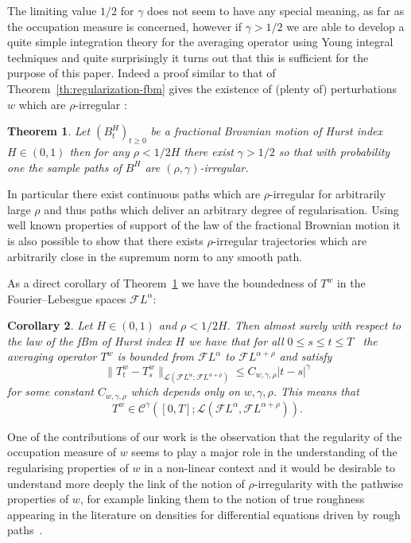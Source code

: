 \documentclass[a4paper,11pt]{article}
\newtheorem{theorem}{Theorem}[section]
\newtheorem{corollary}[theorem]{Corollary}
\newcommand{\CC}{\mathscr C}
\newcommand{\CF}{\mathscr F}
\begin{document}
The limiting value $1/2$ for $\gamma$ does not seem to have any special meaning, as
far as the occupation measure is concerned, however if $\gamma >1/2$ we are
able to develop a quite simple integration theory for the averaging operator
using Young integral techniques and quite surprisingly it turns out that this
is sufficient for the purpose of this paper. Indeed a proof similar to that of
Theorem~\ref{th:regularization-fbm} gives the existence of (plenty of)
perturbations $w$ which are $\rho$-irregular :

\begin{theorem}
  \label{th:irr-for-fbm}Let $(B^{H}_{t} )_{t \geqslant 0}$ be a fractional
  Brownian motion of Hurst index $H \in ( 0,1 )$ then for any $\rho <1/2H$
  there exist $\gamma >1/2$ so that with probability one the sample paths of
  $B^{H}$ are $( \rho , \gamma )$-irregular.
\end{theorem}

In particular there exist continuous paths which are $\rho$-irregular for
arbitrarily large $\rho$ and thus paths which deliver an arbitrary degree of
regularisation. Using well known properties of support of the law of the
fractional Brownian motion it is also possible to show that there exists $\rho$-irregular
trajectories which are arbitrarily close in the supremum norm to any smooth
path.



As a direct corollary of Theorem~\ref{th:irr-for-fbm} we have the boundedness
of $T^{w}$ in the Fourier--Lebesgue spaces $\CF L^{\alpha}$:

\begin{corollary}
  Let $H \in ( 0,1 )$ and $\rho <1/2H$. Then almost surely with respect to the law of the
  fBm of Hurst index $H$ we have that for all $0 \leqslant s \leqslant t
  \leqslant T$ \ the averaging operator $T^{w}$ is bounded from $\CF
  L^{\alpha}$ to $\CF L^{\alpha + \rho}$ and satisfy
  \[ \| T^{w}_{t} -T^{w}_{s} \|_{\mathcal{L} \left( \CF L^{\alpha} ; \CF
     L^{\alpha + \rho} \right)} \leqslant C_{w, \gamma , \rho} | t-s
     |^{\gamma} \]
  for some constant $C_{w, \gamma , \rho}$ which depends only on $w, \gamma ,
  \rho$. This means that $$T^{w}_{} \in \CC^{\gamma} \left( [ 0,T ] ;\mathcal{L}
  \left( \CF L^{\alpha} , \CF L^{\alpha + \rho} \right) \right).$$
\end{corollary}

One of the contributions of our work is the observation that the regularity of
the occupation measure of $w$ seems to play a major role in the understanding
of the regularising properties of $w$ in a non-linear context and it would be
desirable to understand more deeply the link of the notion of
$\rho$-irregularity with the pathwise properties of $w$, for example linking
them to the notion of true roughness appearing in the literature on densities
for differential equations driven by rough paths~{\cite{true-roughness}}.
\end{document}
